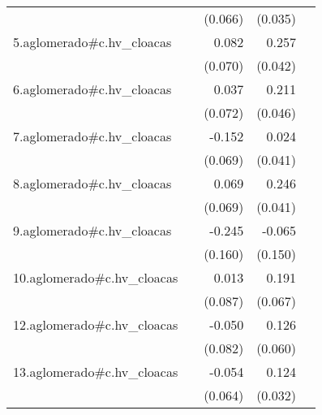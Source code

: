 {\begin{longtable}{l*{4}{D{.}{.}{-1}}}
            &                     &     (0.066)         &     (0.035)         &                     \\
\addlinespace
5.aglomerado#c.hv\_cloacas&                     &       0.082         &       0.257\sym{***}&                     \\
            &                     &     (0.070)         &     (0.042)         &                     \\
\addlinespace
6.aglomerado#c.hv\_cloacas&                     &       0.037         &       0.211\sym{***}&                     \\
            &                     &     (0.072)         &     (0.046)         &                     \\
\addlinespace
7.aglomerado#c.hv\_cloacas&                     &      -0.152\sym{*}  &       0.024         &                     \\
            &                     &     (0.069)         &     (0.041)         &                     \\
\addlinespace
8.aglomerado#c.hv\_cloacas&                     &       0.069         &       0.246\sym{***}&                     \\
            &                     &     (0.069)         &     (0.041)         &                     \\
\addlinespace
9.aglomerado#c.hv\_cloacas&                     &      -0.245         &      -0.065         &                     \\
            &                     &     (0.160)         &     (0.150)         &                     \\
\addlinespace
10.aglomerado#c.hv\_cloacas&                     &       0.013         &       0.191\sym{**} &                     \\
            &                     &     (0.087)         &     (0.067)         &                     \\
\addlinespace
12.aglomerado#c.hv\_cloacas&                     &      -0.050         &       0.126\sym{*}  &                     \\
            &                     &     (0.082)         &     (0.060)         &                     \\
\addlinespace
13.aglomerado#c.hv\_cloacas&                     &      -0.054         &       0.124\sym{***}&                     \\
            &                     &     (0.064)         &     (0.032)         &                     \\

\end{longtable}}

